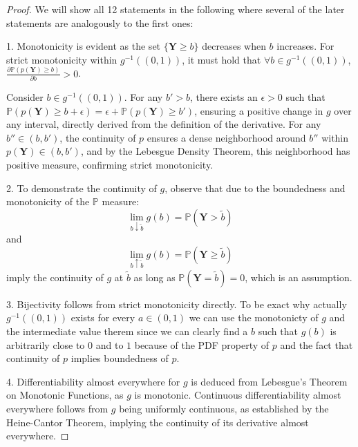 \begin{proof}We will show all 12 statements in the following where several of the later statements are analogously to the first ones:


    1. Monotonicity is evident as the set \(\{\mathbf{Y} \geq b\}\) decreases when \(b\) increases. For strict monotonicity within \(g^{-1}((0,1))\), it must hold that \(\forall b \in g^{-1}((0,1))\), \(\frac{\partial \mathbb{P}(p(\mathbf{Y}) \geq b)}{\partial b} > 0\).

    Consider \(b \in g^{-1}((0,1))\). For any \(b' > b\), there exists an \(\epsilon > 0\) such that \(\mathbb{P}(p(\mathbf{Y}) \geq b + \epsilon) = \epsilon + \mathbb{P}(p(\mathbf{Y}) \geq b')\), ensuring a positive change in \(g\) over any interval, directly derived from the definition of the derivative. For any \(b'' \in (b, b')\), the continuity of \(p\) ensures a dense neighborhood around \(b''\) within \(p(\mathbf{Y}) \in (b, b')\), and by the Lebesgue Density Theorem, this neighborhood has positive measure, confirming strict monotonicity.

    2. To demonstrate the continuity of \(g\), observe that due to the boundedness and monotonicity of the \(\mathbb{P}\) measure:
    \begin{equation}
        \lim_{b \downarrow \tilde{b}} g(b) = \mathbb{P}(\mathbf{Y} > \tilde{b})
    \end{equation}
    and
    \begin{equation}
        \lim_{b \uparrow \tilde{b}} g(b) = \mathbb{P}(\mathbf{Y} \geq \tilde{b})
    \end{equation}
    imply the continuity of \(g\) at \(\tilde{b}\) as long as \(\mathbb{P}(\mathbf{Y} = \tilde{b}) = 0\), which is an assumption.


    3. Bijectivity follows from strict monotonicity directly. To be exact why actually $g^{-1}((0,1))$ exists for every $a \in (0,1)$ we can use the monotonicty of $g$ and the intermediate value therem since we can clearly find a $b$ such that $g(b)$ is arbitrarily close to $0$ and to $1$ because of the PDF property of $p$ and the fact that continuity of $p$ implies boundedness of $p$.

    4. Differentiability almost everywhere for \(g\) is deduced from Lebesgue's Theorem on Monotonic Functions, as \(g\) is monotonic. Continuous differentiability almost everywhere follows from \(g\) being uniformly continuous, as established by the Heine-Cantor Theorem, implying the continuity of its derivative almost everywhere.


\end{proof}
